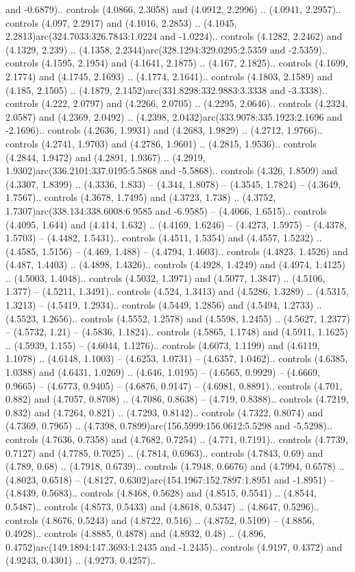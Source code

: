 and -0.6879).. controls (4.0866, 2.3058) and (4.0912, 2.2996) .. (4.0941, 2.2957).. controls (4.097, 2.2917) and (4.1016, 2.2853) .. (4.1045, 2.2813)arc(324.7033:326.7843:1.0224 and -1.0224).. controls (4.1282, 2.2462) and (4.1329, 2.239) .. (4.1358, 2.2344)arc(328.1294:329.0295:2.5359 and -2.5359).. controls (4.1595, 2.1954) and (4.1641, 2.1875) .. (4.167, 2.1825).. controls (4.1699, 2.1774) and (4.1745, 2.1693) .. (4.1774, 2.1641).. controls (4.1803, 2.1589) and (4.185, 2.1505) .. (4.1879, 2.1452)arc(331.8298:332.9883:3.3338 and -3.3338).. controls (4.222, 2.0797) and (4.2266, 2.0705) .. (4.2295, 2.0646).. controls (4.2324, 2.0587) and (4.2369, 2.0492) .. (4.2398, 2.0432)arc(333.9078:335.1923:2.1696 and -2.1696).. controls (4.2636, 1.9931) and (4.2683, 1.9829) .. (4.2712, 1.9766).. controls (4.2741, 1.9703) and (4.2786, 1.9601) .. (4.2815, 1.9536).. controls (4.2844, 1.9472) and (4.2891, 1.9367) .. (4.2919, 1.9302)arc(336.2101:337.0195:5.5868 and -5.5868).. controls (4.326, 1.8509) and (4.3307, 1.8399) .. (4.3336, 1.833) -- (4.344, 1.8078) -- (4.3545, 1.7824) -- (4.3649, 1.7567).. controls (4.3678, 1.7495) and (4.3723, 1.738) .. (4.3752, 1.7307)arc(338.134:338.6008:6.9585 and -6.9585) -- (4.4066, 1.6515).. controls (4.4095, 1.644) and (4.414, 1.632) .. (4.4169, 1.6246) -- (4.4273, 1.5975) -- (4.4378, 1.5703) -- (4.4482, 1.5431).. controls (4.4511, 1.5354) and (4.4557, 1.5232) .. (4.4585, 1.5156) -- (4.469, 1.488) -- (4.4794, 1.4603).. controls (4.4823, 1.4526) and (4.487, 1.4403) .. (4.4898, 1.4326).. controls (4.4928, 1.4249) and (4.4974, 1.4125) .. (4.5003, 1.4048).. controls (4.5032, 1.3971) and (4.5077, 1.3847) .. (4.5106, 1.377) -- (4.5211, 1.3491).. controls (4.524, 1.3413) and (4.5286, 1.3289) .. (4.5315, 1.3213) -- (4.5419, 1.2934).. controls (4.5449, 1.2856) and (4.5494, 1.2733) .. (4.5523, 1.2656).. controls (4.5552, 1.2578) and (4.5598, 1.2455) .. (4.5627, 1.2377) -- (4.5732, 1.21) -- (4.5836, 1.1824).. controls (4.5865, 1.1748) and (4.5911, 1.1625) .. (4.5939, 1.155) -- (4.6044, 1.1276).. controls (4.6073, 1.1199) and (4.6119, 1.1078) .. (4.6148, 1.1003) -- (4.6253, 1.0731) -- (4.6357, 1.0462).. controls (4.6385, 1.0388) and (4.6431, 1.0269) .. (4.646, 1.0195) -- (4.6565, 0.9929) -- (4.6669, 0.9665) -- (4.6773, 0.9405) -- (4.6876, 0.9147) -- (4.6981, 0.8891).. controls (4.701, 0.882) and (4.7057, 0.8708) .. (4.7086, 0.8638) -- (4.719, 0.8388).. controls (4.7219, 0.832) and (4.7264, 0.821) .. (4.7293, 0.8142).. controls (4.7322, 0.8074) and (4.7369, 0.7965) .. (4.7398, 0.7899)arc(156.5999:156.0612:5.5298 and -5.5298).. controls (4.7636, 0.7358) and (4.7682, 0.7254) .. (4.771, 0.7191).. controls (4.7739, 0.7127) and (4.7785, 0.7025) .. (4.7814, 0.6963).. controls (4.7843, 0.69) and (4.789, 0.68) .. (4.7918, 0.6739).. controls (4.7948, 0.6676) and (4.7994, 0.6578) .. (4.8023, 0.6518) -- (4.8127, 0.6302)arc(154.1967:152.7897:1.8951 and -1.8951) -- (4.8439, 0.5683).. controls (4.8468, 0.5628) and (4.8515, 0.5541) .. (4.8544, 0.5487).. controls (4.8573, 0.5433) and (4.8618, 0.5347) .. (4.8647, 0.5296).. controls (4.8676, 0.5243) and (4.8722, 0.516) .. (4.8752, 0.5109) -- (4.8856, 0.4928).. controls (4.8885, 0.4878) and (4.8932, 0.48) .. (4.896, 0.4752)arc(149.1894:147.3693:1.2435 and -1.2435).. controls (4.9197, 0.4372) and (4.9243, 0.4301) .. (4.9273, 0.4257).. 